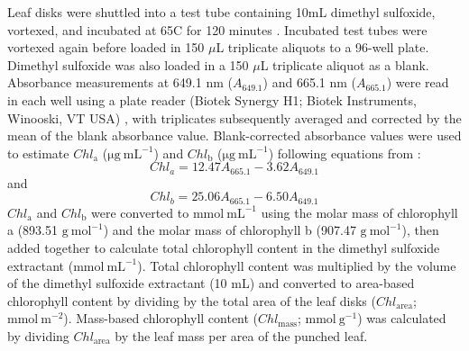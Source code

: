 Leaf disks were shuttled into a test tube containing 10mL dimethyl sulfoxide, vortexed, and incubated at 65\textdegree{}C for 120 minutes . Incubated test tubes were vortexed again before loaded in 150 $\mu$L triplicate aliquots to a 96-well plate. Dimethyl sulfoxide was also loaded in a 150 $\mu$L triplicate aliquot as a blank. Absorbance measurements at 649.1 nm ($A_{649.1}$) and 665.1 nm ($A_{665.1}$) were read in each well using a plate reader (Biotek Synergy H1; Biotek Instruments, Winooski, VT USA) , with triplicates subsequently averaged and corrected by the mean of the blank absorbance value. Blank-corrected absorbance values were used to estimate $Chl_\mathrm{a}$ ($\mathrm{\mu g\ mL^{-1}}$) and $Chl_\mathrm{b}$ ($\mathrm{\mu g\ mL^{-1}}$) following equations from :
\begin{equation} \label{eq_5.1}
    Chl_{a}=12.47A_{665.1}-3.62A_{649.1}
\end{equation}
\noindent and
\begin{equation} \label{eq_5.2}
    Chl_{b}=25.06A_{665.1}-6.50A_{649.1}
\end{equation}
\noindent $Chl_\mathrm{a}$ and $Chl_\mathrm{b}$ were converted to $\mathrm{mmol\ mL^{-1}}$ using the molar mass of chlorophyll a (893.51 $\mathrm{g\ mol^{-1}}$) and the molar mass of chlorophyll b (907.47 $\mathrm{g\ mol^{-1}}$), then added together to calculate total chlorophyll content in the dimethyl sulfoxide extractant ($\mathrm{mmol\ mL^{-1}}$). Total chlorophyll content was multiplied by the volume of the dimethyl sulfoxide extractant (10 mL) and converted to area-based chlorophyll content by dividing by the total area of the leaf disks ($Chl_\mathrm{area}$; $\mathrm{mmol\ m^{-2}}$). Mass-based chlorophyll content ($Chl_\mathrm{mass}$; $\mathrm{mmol\ g^{-1}}$) was calculated by dividing $Chl_\mathrm{area}$ by the leaf mass per area of the punched leaf.

